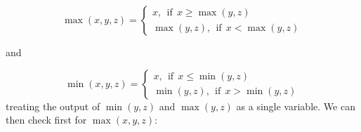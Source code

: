 \documentclass{article}
\begin{document}
\begin{equation*}
	\max(x, y, z) = 
	\begin{cases}
	x, \ \ \mbox{if} \ \ x \geq \max(y, z) \\
	\max(y, z), \ \ \mbox{if} \ \ x < \max(y, z)
	\end{cases}
\end{equation*}

and

\begin{equation*}
	\min(x, y, z) = 
	\begin{cases}
		x, \ \ \mbox{if} \ \ x \leq \min(y, z) \\
		\min(y, z), \ \ \mbox{if} \ \ x > \min(y, z)
	\end{cases}
\end{equation*}
treating the output of \(\min(y,z)\) and \(\max(y,z)\) as a single variable.
We can then check first for \(\max(x, y, z)\):
\end{document}
